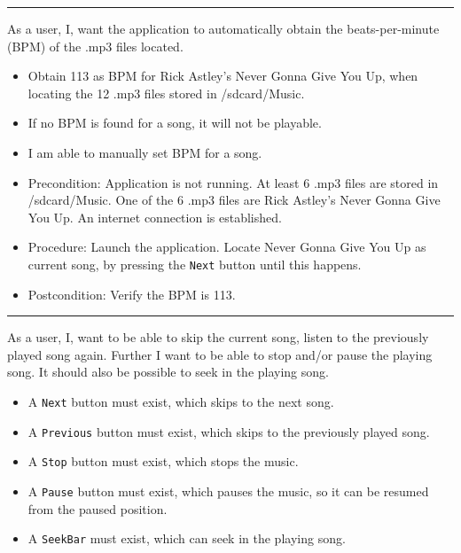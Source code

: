 \rule{\textwidth}{1pt}

{As a user, I, want the application to automatically obtain the beats-per-minute (BPM) of the .mp3 files located.}
{\begin{itemize}
\item Obtain 113 as BPM for Rick Astley's Never Gonna Give You Up, when locating the 12 .mp3 files stored in /sdcard/Music.
\item If no BPM is found for a song, it will not be playable.
\item I am able to manually set BPM for a song.
\end{itemize}}

\begin{itemize}
\item Precondition: 
\subitem Application is not running.
\subitem At least 6 .mp3 files are stored in /sdcard/Music.
\subitem One of the 6 .mp3 files are Rick Astley's Never Gonna Give You Up.
\subitem An internet connection is established.

\item Procedure:
\subitem Launch the application.
\subitem Locate Never Gonna Give You Up as current song, by pressing the \texttt{Next} button until this happens.

\item Postcondition:
\subitem Verify the BPM is 113.
\end{itemize}

\rule{\textwidth}{1pt}

{As a user, I, want to be able to skip the current song, listen to the previously played song again. 
Further I want to be able to stop and/or pause the playing song.
It should also be possible to seek in the playing song.}
{\begin{itemize}
\item A \texttt{Next} button must exist, which skips to the next song.
\item A \texttt{Previous} button must exist, which skips to the previously played song.
\item A \texttt{Stop} button must exist, which stops the music.
\item A \texttt{Pause} button must exist, which pauses the music, so it can be resumed from the paused position.
\item A \texttt{SeekBar} must exist, which can seek in the playing song.
\end{itemize}}

